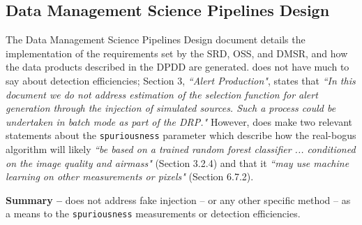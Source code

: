 \documentclass[DM,lsstdraft,toc]{lsstdoc}
\begin{document}
\subsection{Data Management Science Pipelines Design}\label{ssec:docs_ldm151}

The Data Management Science Pipelines Design document  details the implementation of the requirements set by the SRD, OSS, and DMSR, and how the data products described in the DPDD are generated.  does not have much to say about detection efficiencies; Section 3, {\it ``Alert Production"}, states that {\it ``In this document we do not address estimation of the selection function for alert generation through the injection of simulated sources. Such a process could be undertaken in batch mode as part of the DRP."} However,  does make two relevant statements about the {\tt spuriousness} parameter which describe how the real-bogus algorithm will likely {\it ``be based on a trained random forest classifier ... conditioned on the image quality and airmass"} (Section 3.2.4) and that it  {\it ``may use machine learning on other measurements or pixels"} (Section 6.7.2).

{\bf Summary --}  does not address fake injection -- or any other specific method -- as a means to the {\tt spuriousness} measurements or detection efficiencies.


\end{document}

